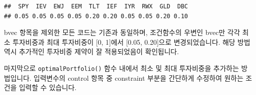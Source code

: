 \documentclass[12pt,]{book}
\newenvironment{Shaded}{\begin{snugshade}}{\end{snugshade}}
\newcommand{\DecValTok}[1]{\textcolor[rgb]{0.00,0.00,0.81}{#1}}
\newcommand{\FloatTok}[1]{\textcolor[rgb]{0.00,0.00,0.81}{#1}}
\newcommand{\KeywordTok}[1]{\textcolor[rgb]{0.13,0.29,0.53}{\textbf{#1}}}
\newcommand{\NormalTok}[1]{#1}
\newcommand{\OperatorTok}[1]{\textcolor[rgb]{0.81,0.36,0.00}{\textbf{#1}}}
\newcommand{\StringTok}[1]{\textcolor[rgb]{0.31,0.60,0.02}{#1}}
\begin{document}
\begin{Shaded}
\end{Shaded}

\begin{verbatim}
##  SPY  IEV  EWJ  EEM  TLT  IEF  IYR  RWX  GLD  DBC 
## 0.05 0.05 0.05 0.05 0.20 0.20 0.05 0.05 0.20 0.10
\end{verbatim}

bvec 항목을 제외한 모든 코드는 기존과 동일하며, 조건함수의 우변인 bvec만 각각 최소 투자비중과 최대 투자비중이 {[}0, 1{]}에서 {[}0.05, 0.20{]}으로 변경되었습니다. 해당 방법 역시 추가적인 투자비중 제약이 잘 적용되었음이 확인됩니다.

마지막으로 \texttt{optimalPortfolio()} 함수 내에서 최소 및 최대 투자비중을 추가하는 방법입니다. 입력변수의 control 항목 중 constraint 부분을 간단하게 수정하여 원하는 조건을 입력할 수 있습니다.
\end{document}
